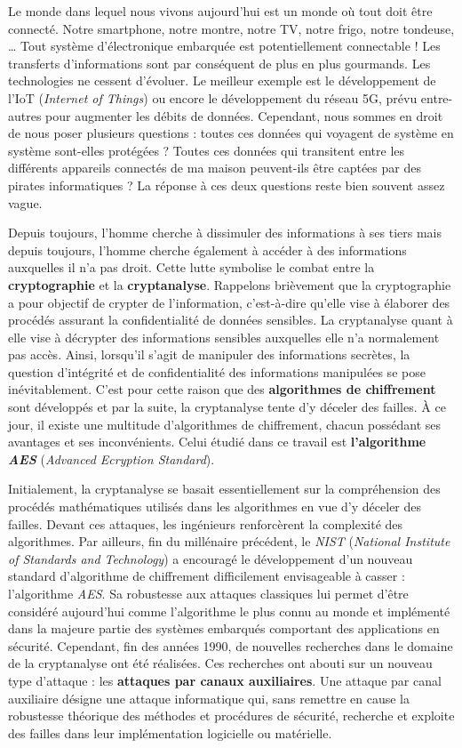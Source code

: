 \documentclass[oneside]{book}
\begin{document}
Le monde dans lequel nous vivons aujourd’hui est un monde où tout doit être connecté. Notre smartphone, notre montre, notre TV, notre frigo, notre tondeuse, … Tout système d’électronique embarquée est potentiellement connectable ! Les transferts d’informations sont par conséquent de plus en plus gourmands. Les technologies ne cessent d’évoluer. Le meilleur exemple est le développement de l'IoT (\textit{Internet of Things}) ou encore le développement du réseau 5G, prévu entre-autres pour augmenter les débits de données. Cependant, nous sommes en droit de nous poser plusieurs questions : toutes ces données qui voyagent de système en système sont-elles protégées ? Toutes ces données qui transitent entre les différents appareils connectés de ma maison peuvent-ils être captées par des pirates informatiques ? La réponse à ces deux questions reste bien souvent assez vague.

Depuis toujours, l’homme cherche à dissimuler des informations à ses tiers mais depuis toujours, l’homme cherche également à accéder à des informations auxquelles il n’a pas droit. Cette lutte symbolise le combat entre la \textbf{cryptographie} et la \textbf{cryptanalyse}. Rappelons brièvement que la cryptographie a pour objectif de crypter de l’information, c’est-à-dire qu’elle vise à élaborer des procédés assurant la confidentialité de données sensibles. La cryptanalyse quant à elle vise à décrypter des informations sensibles auxquelles elle n'a normalement pas accès. Ainsi, lorsqu'il s'agit de manipuler des informations secrètes, la question d'intégrité et de confidentialité des informations manipulées se pose inévitablement. C'est pour cette raison que des \textbf{algorithmes de chiffrement} sont développés et par la suite, la cryptanalyse tente d'y déceler des failles. À ce jour, il existe une multitude d'algorithmes de chiffrement, chacun possédant ses avantages et ses inconvénients. Celui étudié dans ce travail est \textbf{l'algorithme \textit{AES}} (\textit{Advanced Ecryption Standard}).

Initialement, la cryptanalyse se basait essentiellement sur la compréhension des procédés mathématiques utilisés dans les algorithmes en vue d'y déceler des failles. Devant ces attaques, les ingénieurs renforcèrent la complexité des algorithmes. Par ailleurs, fin du millénaire précédent, le \textit{NIST} (\textit{National Institute of Standards and Technology}) a encouragé le développement d’un nouveau standard d’algorithme de chiffrement difficilement envisageable à casser : l’algorithme \textit{AES}. Sa robustesse aux attaques classiques lui permet d'être considéré aujourd’hui comme l'algorithme le plus connu au monde et implémenté dans la majeure partie des systèmes embarqués comportant des applications en sécurité. Cependant, fin des années 1990, de nouvelles recherches dans le domaine de la cryptanalyse ont été réalisées. Ces recherches ont abouti sur un nouveau type d'attaque : les \textbf{attaques par canaux auxiliaires}. Une attaque par canal auxiliaire désigne une attaque informatique qui, sans remettre en cause la robustesse théorique des méthodes et procédures de sécurité, recherche et exploite des failles dans leur implémentation logicielle ou matérielle. 
\end{document}
